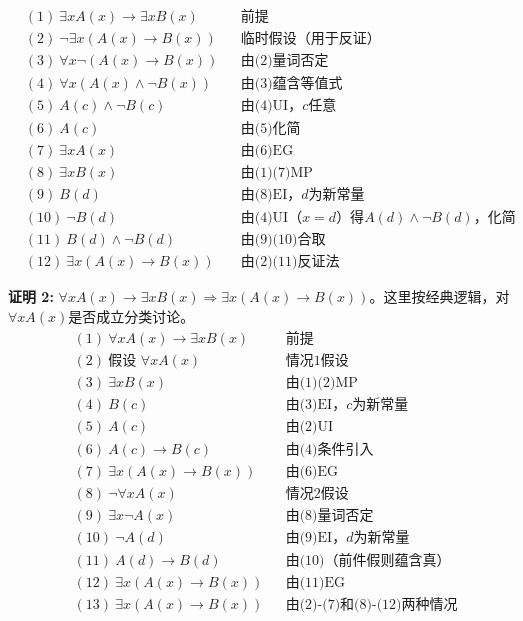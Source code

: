 \documentclass[lang=cn,11pt]{elegantbook}
\begin{document}
\begin{align*}
&(1)\ \exists xA(x) \to \exists xB(x) && \text{前提} \\
&(2)\ \neg\exists x(A(x)\to B(x)) && \text{临时假设（用于反证）} \\
&(3)\ \forall x\neg(A(x)\to B(x)) && \text{由(2)量词否定} \\
&(4)\ \forall x(A(x) \land \neg B(x)) && \text{由(3)蕴含等值式} \\
&(5)\ A(c) \land \neg B(c) && \text{由(4)UI，$c$任意} \\
&(6)\ A(c) && \text{由(5)化简} \\
&(7)\ \exists xA(x) && \text{由(6)EG} \\
&(8)\ \exists xB(x) && \text{由(1)(7)MP} \\
&(9)\ B(d) && \text{由(8)EI，$d$为新常量} \\
&(10)\ \neg B(d) && \text{由(4)UI（$x=d$）得$A(d) \land \neg B(d)$，化简} \\
&(11)\ B(d) \land \neg B(d) && \text{由(9)(10)合取} \\
&(12)\ \exists x(A(x)\to B(x)) && \text{由(2)(11)反证法}
\end{align*}

\noindent
\textbf{证明 2:} $\forall xA(x)\to \exists xB(x)\Rightarrow \exists x(A(x)\to B(x))$。这里按经典逻辑，对$\forall xA(x)$是否成立分类讨论。
\vspace{-10pt}
\begin{align*}
&(1)\ \forall xA(x) \to \exists xB(x) && \text{前提} \\
&(2)\ \text{假设 } \forall xA(x) && \text{情况1假设} \\
&(3)\ \exists xB(x) && \text{由(1)(2)MP} \\
&(4)\ B(c) && \text{由(3)EI，$c$为新常量} \\
&(5)\ A(c) && \text{由(2)UI} \\
&(6)\ A(c) \to B(c) && \text{由(4)条件引入} \\
&(7)\ \exists x(A(x)\to B(x)) && \text{由(6)EG} \\
&(8)\ \neg\forall xA(x) && \text{情况2假设} \\
&(9)\ \exists x\neg A(x) && \text{由(8)量词否定} \\
&(10)\ \neg A(d) && \text{由(9)EI，$d$为新常量} \\
&(11)\ A(d) \to B(d) && \text{由(10)（前件假则蕴含真）} \\
&(12)\ \exists x(A(x)\to B(x)) && \text{由(11)EG} \\
&(13)\ \exists x(A(x)\to B(x)) && \text{由(2)-(7)和(8)-(12)两种情况}
\end{align*}
\end{document}

